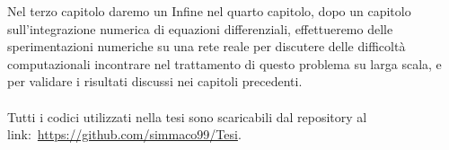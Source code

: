 \documentclass[12pt,a4paper,twoside]{report}
\begin{document}
Nel terzo capitolo daremo un
Infine nel quarto capitolo, dopo un capitolo sull'integrazione numerica di equazioni differenziali,  effettueremo delle sperimentazioni numeriche su una rete reale per discutere delle difficolt\`a computazionali incontrare nel trattamento di questo problema su larga scala, e per validare i risultati discussi nei capitoli precedenti.\\ \\
Tutti i codici utilizzati nella tesi sono scaricabili dal  repository al link:~\url{https://github.com/simmaco99/Tesi}.














\cleardoublepage
\listoffigures
{}
\listoftables
{}
\tableofcontents
\end{document}
